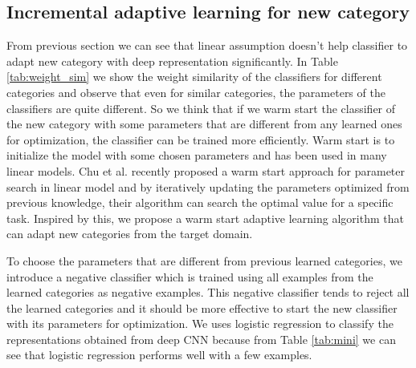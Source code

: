\subsection{Incremental adaptive learning for new category}
From previous section we can see that linear assumption doesn't help classifier to adapt new category with deep representation significantly. 
In Table \ref{tab:weight_sim} we show the weight similarity of the classifiers for different categories and observe that even for similar categories, the parameters of the classifiers are quite different. So we think that if we warm start the classifier of the new category with some parameters that are different from any learned ones for optimization, the classifier can be trained more efficiently. Warm start is to initialize the model with some chosen parameters and has been used in many linear models.
Chu et al. recently proposed a warm start approach for parameter search in linear model and by iteratively updating the parameters optimized from previous knowledge, their algorithm can search the optimal value for a specific task\cite{chuwarm}. Inspired by this, we propose a warm start adaptive learning algorithm that can adapt new categories from the target domain.%

To choose the parameters that are different from previous learned categories, we introduce a negative classifier which is trained using all examples from the learned categories as negative examples. This negative classifier tends to reject all the learned categories and it should be more effective to start the new classifier with its parameters for optimization. We uses logistic regression to classify the representations obtained from deep CNN because from Table \ref{tab:mini} we can see that logistic regression performs well with a few examples.


